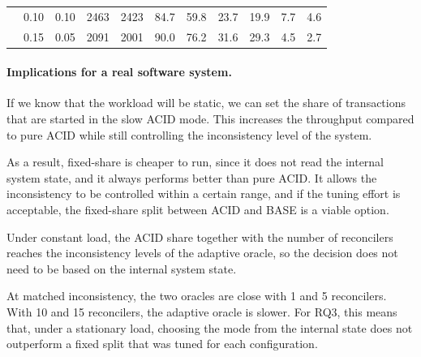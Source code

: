\begin{table}[!htb]
\begin{tabular}{r r c r r r r r r r r}
                                     & 0.10                                &
    0.10                             & 2463                                &
    2423                             & 84.7                                & 59.8
                                     & 23.7                                & 19.9                             & 7.7  & 4.6  \\
                                     & 0.15                                &
    0.05                             & 2091                                &
    2001                             & 90.0                                & 76.2
                                     & 31.6                                & 29.3                             & 4.5  & 2.7  \\
    \bottomrule
  \end{tabular}
\end{table}

\paragraph{Implications for a real software system.}
If we know that the workload will be static, we can set the share of
transactions that are started in the slow ACID mode. This increases the throughput compared to pure
ACID while still controlling the inconsistency level of the system.

As a result, fixed-share is cheaper to run, since it does not read the
internal system state, and it always performs better than pure
ACID. It allows the inconsistency to be controlled within a certain range, and if the
tuning effort is acceptable, the fixed-share split between ACID and BASE is
a viable option.

\FloatBarrier
\findingshead

\begin{bullets}
  \item[O8. The ACID transaction share controls inconsistency.] Under constant load,
  the ACID share together with the number of reconcilers reaches the
  inconsistency levels of the adaptive oracle, so the decision does not need
  to be based on the internal system state.

  \item[O9. The adaptive oracle falls behind as the number of reconciler processors increases.] At matched
  inconsistency, the two oracles are close with 1 and 5 reconcilers. With 10 and
  15 reconcilers, the adaptive oracle is slower. For RQ3, this means that, under a
  stationary load, choosing the mode from the internal state does not outperform
  a fixed split that was tuned for each configuration.
\end{bullets}

